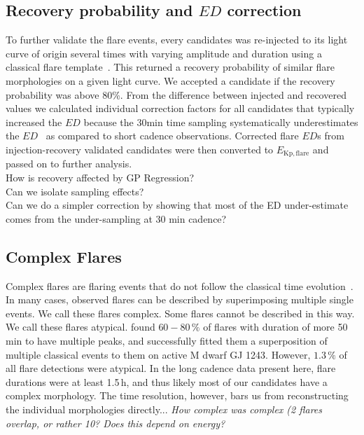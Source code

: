 \documentclass{aa}
\begin{document}
\subsection{Recovery probability and $ED$ correction}
\label{recprob_edcor}
To further validate the flare events, every candidates was re-injected to its light curve of origin several times with varying amplitude and duration using a classical flare template~\citep{davenport_kepler_2014}. This returned a recovery probability of similar flare morphologies on a given light curve. We accepted a candidate if the recovery probability was above 80\;\%. From the difference between injected and recovered values we calculated individual correction factors for all candidates that typically increased the $ED$ because the 30\;min time sampling systematically underestimates the $ED$~\citep{yang_flaresampling_2018} as compared to short cadence observations. Corrected flare $ED$s from injection-recovery validated candidates were then converted to $E_\mathrm{Kp, flare}$ and passed on to further analysis.
\\
How is recovery affected by GP Regression? \\
Can we isolate sampling effects?\\
Can we do a simpler correction by showing that most of the ED under-estimate comes from the under-sampling at 30 min cadence?

\subsection{Complex Flares}
Complex flares are flaring events that do not follow the classical time evolution~\citep{davenport_kepler_2014}. In many cases, observed flares can be described by superimposing multiple single events. We call these flares complex. Some flares cannot be described in this way. We call these flares atypical.
\citet{davenport_kepler_2014} found $60-80\,\%$ of flares with duration of more 50 min to have multiple peaks, and successfully fitted them a superposition of multiple classical events to them on active M dwarf GJ 1243. However, $1.3\,\%$ of all flare detections were atypical. In the long cadence data present here, flare durations were at least 1.5\,h, and thus likely most of our candidates have a complex morphology. The time resolution, however, bars us from reconstructing the individual morphologies directly... \textit{How complex was complex (2 flares overlap, or rather 10? Does this depend on energy?}
\end{document}
